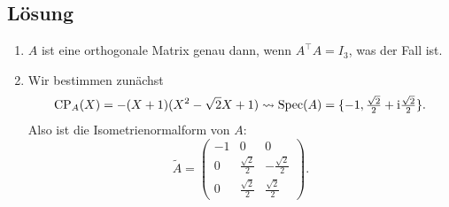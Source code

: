 \subsection{Lösung}
\begin{enumerate}
	\item \( A \) ist eine orthogonale Matrix genau dann, wenn \( A^\top A = I_3 \), was der Fall ist.
	\item Wir bestimmen zunächst
	\begin{equation*}
		\text{CP}_A(X) = -(X+1)(X^2-\sqrt{2}X + 1) \leadsto \text{Spec}(A) = \{ -1, \tfrac{\sqrt{2}}{2}+\text{i}\tfrac{\sqrt{2}}{2} \}\text{.}
	\end{equation*}
	Also ist die Isometrienormalform von \( A \):
	\begin{equation*}
		\widetilde{A} = \begin{pmatrix}
			-1 & 0 & 0 \\
			0 & \tfrac{\sqrt{2}}{2} & -\tfrac{\sqrt{2}}{2} \\
			0 & \tfrac{\sqrt{2}}{2} & \tfrac{\sqrt{2}}{2}
		\end{pmatrix}\text{.}
	\end{equation*}


\end{enumerate}
